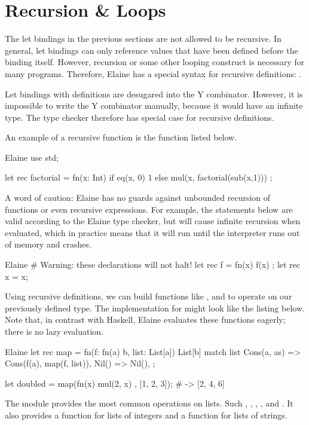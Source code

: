 \section{Recursion \& Loops}\label{sec:recursion}

The let bindings in the previous sections are not allowed to be recursive. In general, let bindings can only reference values that have been defined before the binding itself. However, recursion or some other looping construct is necessary for many programs. Therefore, Elaine has a special syntax for recursive definitions: .

Let bindings with  definitions are desugared into the Y combinator. However, it is impossible to write the Y combinator manually, because it would have an infinite type. The type checker therefore has special case for recursive definitions.

An example of a recursive function is the  function listed below.

\begin{lst}{Elaine}
use std;

let rec factorial = fn(x: Int) {
    if eq(x, 0) {
        1
    } else {
        mul(x, factorial(sub(x,1)))
    }
};
\end{lst}
%
A word of caution: Elaine has no guards against unbounded recursion of functions or even recursive expressions. For example, the statements below are valid according to the Elaine type checker, but will cause infinite recursion when evaluated, which in practice means that it will run until the interpreter runs out of memory and crashes.

\begin{lst}{Elaine}
# Warning: these declarations will not halt!
let rec f = fn(x) { f(x) };
let rec x = x;
\end{lst}
%
Using recursive definitions, we can build functions like ,  and  to operate on our previously defined  type. The implementation for  might look like the listing below. Note that, in contrast with Haskell, Elaine evaluates these functions eagerly; there is no lazy evaluation.

\begin{lst}{Elaine}
let rec map = fn(f: fn(a) b, list: List[a]) List[b] {
    match list {
        Cons(a, as) => Cons(f(a), map(f, list)),
        Nil() => Nil(),
    }
};

let doubled = map(fn(x) { mul(2, x) }, [1, 2, 3]); # -> [2, 4, 6]
\end{lst}
%
The  module provides the most common operations on lists. Such , , , ,  and . It also provides a  function for lists of integers and a  function for lists of strings.

